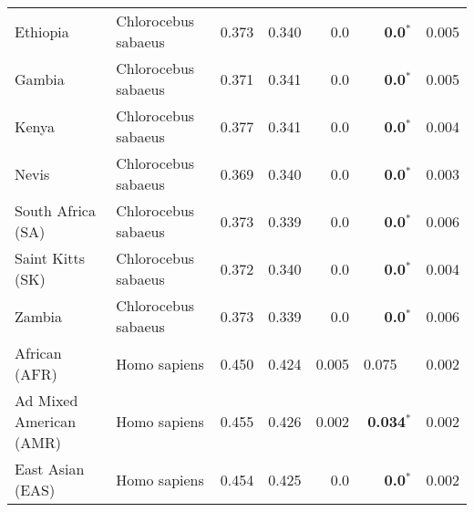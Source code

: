 \begin{center}
\begin{adjustbox}{width = 1\textwidth}
\begin{tabular}{|l|l|r|r|r|r|r|}
                       Ethiopia &  Chlorocebus sabaeus &                                              0.373 &                                              0.340 &              0.0 &                    \textbf{0.0}$\bm{^*}$ &              0.005 \\
                         Gambia &  Chlorocebus sabaeus &                                              0.371 &                                              0.341 &              0.0 &                    \textbf{0.0}$\bm{^*}$ &              0.005 \\
                          Kenya &  Chlorocebus sabaeus &                                              0.377 &                                              0.341 &              0.0 &                    \textbf{0.0}$\bm{^*}$ &              0.004 \\
                          Nevis &  Chlorocebus sabaeus &                                              0.369 &                                              0.340 &              0.0 &                    \textbf{0.0}$\bm{^*}$ &              0.003 \\
              South Africa (SA) &  Chlorocebus sabaeus &                                              0.373 &                                              0.339 &              0.0 &                    \textbf{0.0}$\bm{^*}$ &              0.006 \\
               Saint Kitts (SK) &  Chlorocebus sabaeus &                                              0.372 &                                              0.340 &              0.0 &                    \textbf{0.0}$\bm{^*}$ &              0.004 \\
                         Zambia &  Chlorocebus sabaeus &                                              0.373 &                                              0.339 &              0.0 &                    \textbf{0.0}$\bm{^*}$ &              0.006 \\
                  African (AFR) &         Homo sapiens &                                              0.450 &                                              0.424 &            0.005 &                         0.075~~ &              0.002 \\
        Ad Mixed American (AMR) &         Homo sapiens &                                              0.455 &                                              0.426 &            0.002 &                  \textbf{0.034}$\bm{^*}$ &              0.002 \\
               East Asian (EAS) &         Homo sapiens &                                              0.454 &                                              0.425 &              0.0 &                    \textbf{0.0}$\bm{^*}$ &              0.002 \\

\end{tabular}
\end{adjustbox}
\end{center}
